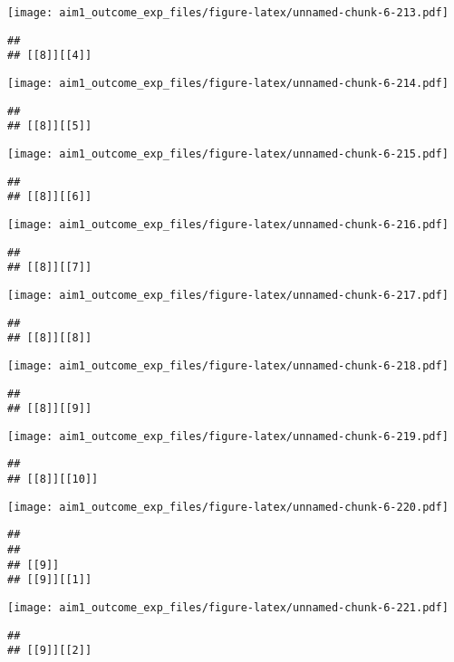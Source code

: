 \documentclass[
]{article}
\begin{document}
\texttt{[image: aim1\_outcome\_exp\_files/figure-latex/unnamed-chunk-6-213.pdf]}

\begin{verbatim}
## 
## [[8]][[4]]
\end{verbatim}

\texttt{[image: aim1\_outcome\_exp\_files/figure-latex/unnamed-chunk-6-214.pdf]}

\begin{verbatim}
## 
## [[8]][[5]]
\end{verbatim}

\texttt{[image: aim1\_outcome\_exp\_files/figure-latex/unnamed-chunk-6-215.pdf]}

\begin{verbatim}
## 
## [[8]][[6]]
\end{verbatim}

\texttt{[image: aim1\_outcome\_exp\_files/figure-latex/unnamed-chunk-6-216.pdf]}

\begin{verbatim}
## 
## [[8]][[7]]
\end{verbatim}

\texttt{[image: aim1\_outcome\_exp\_files/figure-latex/unnamed-chunk-6-217.pdf]}

\begin{verbatim}
## 
## [[8]][[8]]
\end{verbatim}

\texttt{[image: aim1\_outcome\_exp\_files/figure-latex/unnamed-chunk-6-218.pdf]}

\begin{verbatim}
## 
## [[8]][[9]]
\end{verbatim}

\texttt{[image: aim1\_outcome\_exp\_files/figure-latex/unnamed-chunk-6-219.pdf]}

\begin{verbatim}
## 
## [[8]][[10]]
\end{verbatim}

\texttt{[image: aim1\_outcome\_exp\_files/figure-latex/unnamed-chunk-6-220.pdf]}

\begin{verbatim}
## 
## 
## [[9]]
## [[9]][[1]]
\end{verbatim}

\texttt{[image: aim1\_outcome\_exp\_files/figure-latex/unnamed-chunk-6-221.pdf]}

\begin{verbatim}
## 
## [[9]][[2]]
\end{verbatim}
\end{document}
